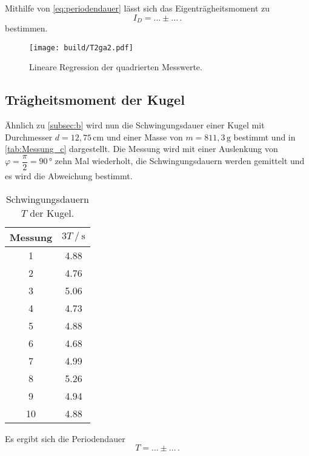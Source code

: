 Mithilfe von \eqref{eq:periodendauer} lässt sich das Eigenträgheitsmoment zu
\begin{equation*}
  I_D = ... \pm ... \,.
\end{equation*}
bestimmen.


\begin{figure}[H]
  \centering
  \texttt{[image: build/T2ga2.pdf]}
  \caption{Lineare Regression der quadrierten Messwerte.}
  \label{fig:T2ga2}
\end{figure}

\subsection{Trägheitsmoment der Kugel}
\label{subsec:c}

Ähnlich zu \autoref{subsec:b} wird nun die Schwingungsdauer einer Kugel mit Durchmesser $d = 12,75 \, \unit{\centi\meter}$ und einer Masse von $m = 811,3 \,\unit{\gram}$ bestimmt und in \autoref{tab:Messung_c} dargestellt.
Die Messung wird mit einer Auslenkung von $\varphi = \dfrac{π}{2} = 90 \,\unit{\degree}$ zehn Mal wiederholt, die Schwingungsdauern werden gemittelt und es wird die Abweichung bestimmt.

\begin{table}[H] %
  \centering
  \begin{tabular}{S[table-format=2.0] S[table-format=1.2]}
      \toprule
      {Messung} & {$3T \mathbin{/} \unit{\second}$}\\
        & 4.88 \\
          2  & 4.76 \\
          3  & 5.06 \\
          4  & 4.73 \\  
          5  & 4.88 \\
          6  & 4.68 \\
          7  & 4.99 \\
          8  & 5.26 \\
          9  & 4.94 \\
          10 & 4.88 \\
      \bottomrule
  \end{tabular}
  \caption{Schwingungsdauern $T$ der Kugel.}
  \label{tab:Messung_c}
\end{table}
Es ergibt sich die Periodendauer
\begin{equation*}
  T= ... \pm ... \,.
\end{equation*}

